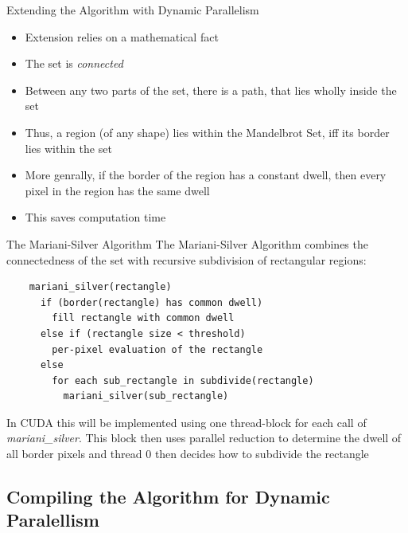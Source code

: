 \documentclass[fleqn,11pt,aspectratio=43]{beamer}
\begin{document}
\begin{frame}{Extending the Algorithm with Dynamic Parallelism}
	\begin{itemize}
		\item Extension relies on a mathematical fact
		\item The set is \textit{connected}
		\item Between any two parts of the set, there is a path, that lies wholly inside the set
		\item Thus, a region (of any shape) lies within the Mandelbrot Set, iff its border lies within the set
		\item More genrally, if the border of the region has a constant dwell, then every pixel in the region has the same dwell
		\item This saves computation time
	\end{itemize}
\end{frame}

\begin{frame}[fragile]{The Mariani-Silver Algorithm}
	The Mariani-Silver Algorithm combines the connectedness of the set with recursive subdivision of rectangular regions:
	\begin{verbatim}
	mariani_silver(rectangle) 
	  if (border(rectangle) has common dwell) 
	    fill rectangle with common dwell
	  else if (rectangle size < threshold)
	    per-pixel evaluation of the rectangle
	  else
	    for each sub_rectangle in subdivide(rectangle)
	      mariani_silver(sub_rectangle)
	\end{verbatim}
	In CUDA this will be implemented using one thread-block for each call of \textit{mariani\_silver}. This block then uses parallel reduction to determine the dwell of all border pixels and thread 0 then decides how to subdivide the rectangle
\end{frame}

\subsection{Compiling the Algorithm for Dynamic Paralellism}
\end{document}
